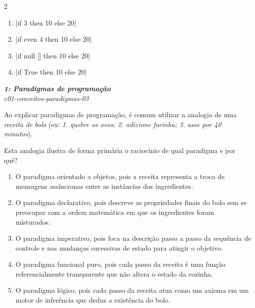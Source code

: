\documentclass[a4paper,10pt,brazil]{article}
\begin{document}
\begin{multicols}{2}
\begin{enumerate}
  \item \haskellinline|if 3 then 10 else 20|

  \item \haskellinline|if even 4 then 10 else 20|

  \item \haskellinline|if null [] then 10 else 20|

  \item \haskellinline|if True then 10 else 20|


\end{enumerate}

\begin{flushright}
  \footnotesize
  \textit{\textbf{1: Paradigmas de programação}}\\
  \textit{c01-conceitos-paradigmas-03}\\

\end{flushright}
Ao explicar paradigmas de programação, é comum utilizar a analogia de uma \emph{receita de bolo} (ex: \emph{1. quebre os ovos; 2. adicione farinha; 3. asse por 40 minutos}). 

Esta analogia ilustra de forma primária o raciocínio de qual paradigma e por quê?

\begin{enumerate}
  \item O paradigma orientado a objetos, pois a receita representa a troca de mensagens assíncronas entre as instâncias dos ingredientes.

  \item O paradigma declarativo, pois descreve as propriedades finais do bolo sem se preocupar com a ordem matemática em que os ingredientes foram misturados.

  \item O paradigma imperativo, pois foca na descrição passo a passo da sequência de controle e nas mudanças sucessivas de estado para atingir o objetivo.

  \item O paradigma funcional puro, pois cada passo da receita é uma função referencialmente transparente que não altera o estado da cozinha.

  \item O paradigma lógico, pois cada passo da receita atua como um axioma em um motor de inferência que deduz a existência do bolo.


\end{enumerate}


\end{multicols}
\end{document}
